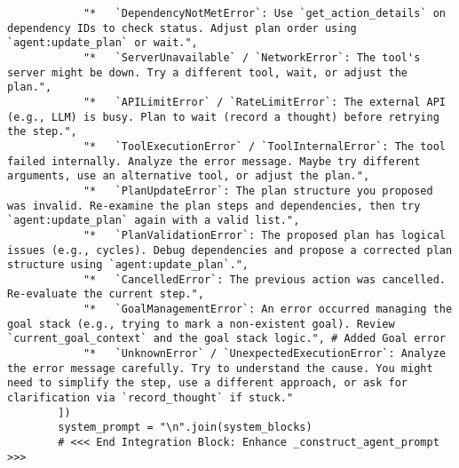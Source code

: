 \documentclass[12pt,a4paper]{article}
\begin{document}
\begin{pageablecode}
\begin{verbatim}
            "*   `DependencyNotMetError`: Use `get_action_details` on dependency IDs to check status. Adjust plan order using `agent:update_plan` or wait.",
            "*   `ServerUnavailable` / `NetworkError`: The tool's server might be down. Try a different tool, wait, or adjust the plan.",
            "*   `APILimitError` / `RateLimitError`: The external API (e.g., LLM) is busy. Plan to wait (record a thought) before retrying the step.",
            "*   `ToolExecutionError` / `ToolInternalError`: The tool failed internally. Analyze the error message. Maybe try different arguments, use an alternative tool, or adjust the plan.",
            "*   `PlanUpdateError`: The plan structure you proposed was invalid. Re-examine the plan steps and dependencies, then try `agent:update_plan` again with a valid list.",
            "*   `PlanValidationError`: The proposed plan has logical issues (e.g., cycles). Debug dependencies and propose a corrected plan structure using `agent:update_plan`.",
            "*   `CancelledError`: The previous action was cancelled. Re-evaluate the current step.",
            "*   `GoalManagementError`: An error occurred managing the goal stack (e.g., trying to mark a non-existent goal). Review `current_goal_context` and the goal stack logic.", # Added Goal error
            "*   `UnknownError` / `UnexpectedExecutionError`: Analyze the error message carefully. Try to understand the cause. You might need to simplify the step, use a different approach, or ask for clarification via `record_thought` if stuck."
        ])
        system_prompt = "\n".join(system_blocks)
        # <<< End Integration Block: Enhance _construct_agent_prompt >>>


\end{verbatim}
\end{pageablecode}
\end{document}
